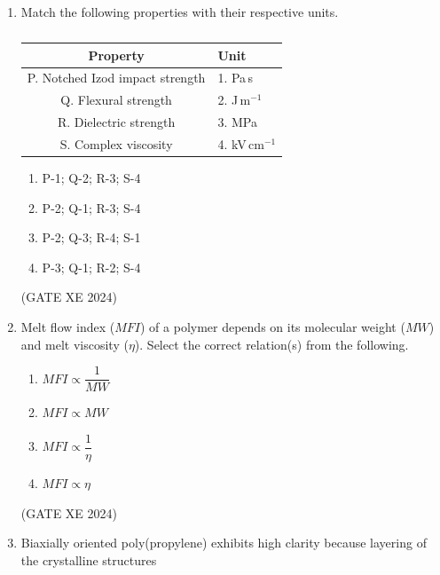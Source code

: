 \documentclass[12pt]{article}
\begin{document}
\begin{enumerate}
\begin{enumerate}
\item P-3; Q-4; R-2; S-1  
\item P-2; Q-4; R-1; S-3  
\item P-3; Q-2; R-1; S-4  
\item P-4; Q-2; R-1; S-3  
\end{enumerate}

(GATE XE 2024)

\item Match the following properties with their respective units.  

\begin{table}[H]
\centering
\caption{}
\label{}
\begin{tabular}{|c|l|}
\hline
\textbf{Property} & \textbf{Unit} \\
\hline
P. Notched Izod impact strength & 1. Pa\,s \\
Q. Flexural strength & 2. J\,m$^{-1}$ \\
R. Dielectric strength & 3. MPa \\
S. Complex viscosity & 4. kV\,cm$^{-1}$ \\
\hline
\end{tabular}
\end{table}

\begin{enumerate}
\item P-1; Q-2; R-3; S-4  
\item P-2; Q-1; R-3; S-4  
\item P-2; Q-3; R-4; S-1  
\item P-3; Q-1; R-2; S-4  
\end{enumerate}

(GATE XE 2024)

\item Melt flow index ($MFI$) of a polymer depends on its molecular weight ($MW$) and melt viscosity ($\eta$). Select the correct relation(s) from the following.  

\begin{enumerate}
\item $MFI \propto \dfrac{1}{MW}$  
\item $MFI \propto MW$  
\item $MFI \propto \dfrac{1}{\eta}$  
\item $MFI \propto \eta$  
\end{enumerate}

(GATE XE 2024)

\item Biaxially oriented poly(propylene) exhibits high clarity because layering of the crystalline structures  


\end{enumerate}
\end{document}
